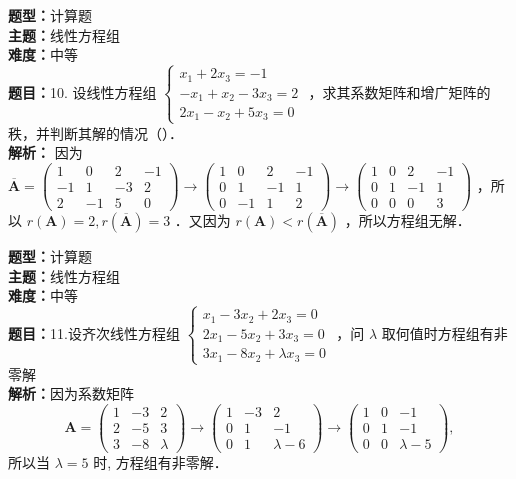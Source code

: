\documentclass{ctexart}
\newenvironment{question}[5]{%
	\noindent\textbf{题型：}#1\\
	\textbf{主题：}#2\\
	\textbf{难度：}#3\\
	\textbf{题目：}#4\\
	\textbf{解析：}#5\\
	\vspace{1em}
}{}
\begin{document}
	
	\begin{question}
		{计算题}
		{线性方程组}
		{中等}
		{10. 设线性方程组 \(\left\{\begin{array}{c}x_1+2 x_3=-1 \\ -x_1+x_2-3 x_3=2 \\ 2 x_1-x_2+5 x_3=0\end{array}\right.\) ，求其系数矩阵和增广矩阵的秩，并判断其解的情况（）．}
		{ 因为 \(\overline{\mathbf{A}}=\left(\begin{array}{cccc}1 & 0 & 2 & -1 \\ -1 & 1 & -3 & 2 \\ 2 & -1 & 5 & 0\end{array}\right) \rightarrow\left(\begin{array}{cccc}1 & 0 & 2 & -1 \\ 0 & 1 & -1 & 1 \\ 0 & -1 & 1 & 2\end{array}\right) \rightarrow \left(\begin{array}{cccc}1 & 0 & 2 & -1 \\ 0 & 1 & -1 & 1 \\ 0 & 0 & 0 & 3\end{array}\right)\) ，所以 \(r(\mathbf{A})=2, r(\overline{\mathbf{A}})=3\) ．又因为 \(r(\mathbf{A})<r(\overline{\mathbf{A}})\) ，所以方程组无解．}
	\end{question}
	
	
	\begin{question}
		{计算题}
		{线性方程组}
		{中等}
		{11.设齐次线性方程组 \(\left\{\begin{array}{c}x_1-3 x_2+2 x_3=0 \\ 2 x_1-5 x_2+3 x_3=0 \\ 3 x_1-8 x_2+\lambda x_3=0\end{array}\right.\) ，问 \(\lambda\) 取何值时方程组有非零解}
		{因为系数矩阵 \[\mathbf{A}=\left(\begin{array}{ccc}1 & -3 & 2 \\ 2 & -5 & 3 \\ 3 & -8 & \lambda\end{array}\right) \rightarrow\left(\begin{array}{ccc}1 & -3 & 2 \\ 0 & 1 & -1 \\ 0 & 1 & \lambda-6\end{array}\right) \rightarrow\left(\begin{array}{ccc}1 & 0 & -1 \\ 0 & 1 & -1 \\ 0 & 0 & \lambda-5\end{array}\right),\] 所以当 \(\lambda=5\) 时, 方程组有非零解．}
	\end{question}
	
\end{document}
